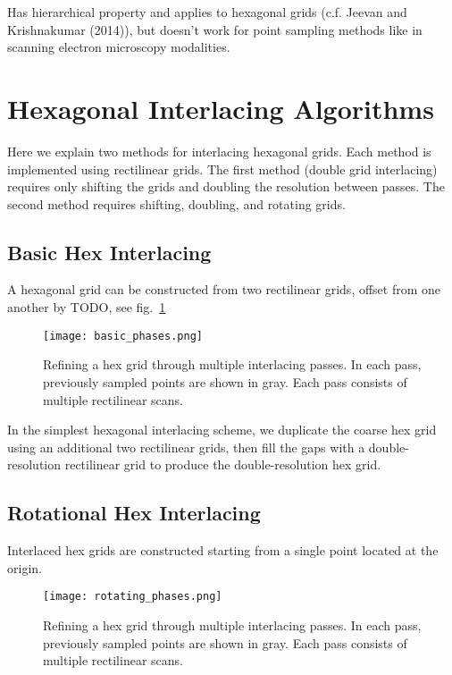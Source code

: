 \documentclass{article}
\begin{document}
Has hierarchical property and applies to hexagonal grids (c.f. Jeevan
and Krishnakumar (2014)), but doesn't work for point sampling methods
like in scanning electron microscopy modalities.


\section{Hexagonal Interlacing Algorithms}
\label{sec:hexinter}

Here we explain two methods for interlacing hexagonal grids.
%
Each method is implemented using rectilinear grids.
%
The first method (double grid interlacing) requires only shifting the grids and doubling the resolution between passes.
%
The second method requires shifting, doubling, and rotating grids.


\subsection{Basic Hex Interlacing}
\label{double-grid-interlacing}

A hexagonal grid can be constructed from two rectilinear grids, offset
from one another by TODO, see fig.~\ref{fig:basicphases}

\begin{figure}[ht]
\centering
\texttt{[image: basic\_phases.png]}
\caption{
\label{fig:basicphases} Refining a hex grid through multiple interlacing passes.
%
In each pass, previously sampled points are shown in gray.
%
Each pass consists of multiple rectilinear scans.
}
\end{figure}

In the simplest hexagonal interlacing scheme, we duplicate the coarse hex grid using an additional two rectilinear grids, then fill the gaps with a double-resolution rectilinear grid to produce the double-resolution hex grid.

\subsection{Rotational Hex Interlacing}
\label{triple-grid-interlacing}

Interlaced hex grids are constructed starting from a single point
located at the origin.

\begin{figure}[ht]
\centering
\texttt{[image: rotating\_phases.png]}
\caption{
\label{fig:rotatingphases} Refining a hex grid through multiple interlacing passes.
%
In each pass, previously sampled points are shown in gray.
%
Each pass consists of multiple rectilinear scans.
}
\end{figure}
\end{document}
